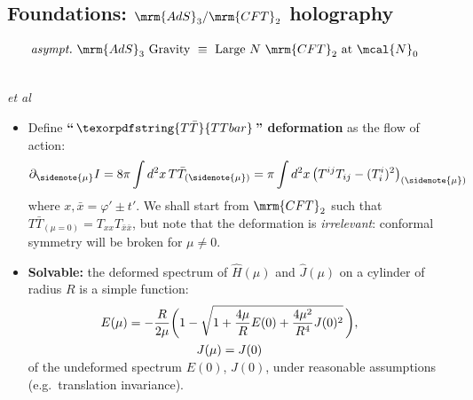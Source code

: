\documentclass[10pt]{article}
\newcommand{\citations}[1]{{\footnotesize#1\par}}
\newcommand{\TTbar}{\texorpdfstring{\ensuremath{T\bar{T}}}{TTbar}\xspace}
\begin{document}
\begin{multicols}{3}
\subsection*{Foundations: $\mrm{AdS}_3/\mrm{CFT}_2$ holography}
\vspace{-.5\baselineskip}
\begin{align*}
	\textrm{\textit{asympt.}~$\mrm{AdS}_3$ Gravity}
	&\ \equiv\ 
	\textrm{Large $N$ $\mrm{CFT}_2$ at $\mcal{N}_0$}
\end{align*}

\citations{\noindent%
	\textcite{Maldacena:1997re}\\
	\textcite{Aharony:1999ti} \textit{et al}
}


%
%	


\begin{itemize}

\item Define \textbf{``\,$\TTbar$\,'' deformation} as the flow of action:
\begin{equation}
	\partial_{\sidenote{\mu}} I = {8 \pi} \int d^2x \, T\bar T_{(\sidenote{\mu})} = {\pi} \int d^2x\,\big( T^{ij}T_{ij}- (T^i_i)^2 \big)_{(\sidenote{\mu})}
	\label{TTbardef}
\end{equation}
where $x, \bar{x} = \varphi' \pm t'$.
We shall start from $\mrm{CFT}_2$ such that $T\bar{T}_{(\mu = 0)} = T_{xx} T_{\bar{x}\bar{x}}$, but note that the deformation is \textit{irrelevant}: conformal symmetry will be broken for $\mu \ne 0$.

\item \textbf{Solvable:} the deformed spectrum of $\hat{H}(\mu)$ and $\hat{J}(\mu)$ on a cylinder of radius $R$ is a simple function:
\begin{equation}
\hspace{-2em}
\begin{gathered}
	E(\mu) = - \frac{R }{ 2\mu } \bigg(1-\sqrt{1 + \frac{4\mu}{R} E(0) + \frac{4\mu^2}{R^4} J(0)^2 }
	\,\bigg), \\ J(\mu)=J(0) \\[-1.5ex]
\end{gathered} \label{ttbarspectrum}
\end{equation}
of the undeformed spectrum $E(0)$, $J(0)$,
under reasonable assumptions (e.g.~translation invariance). 


\end{itemize}
\end{multicols}
\end{document}
